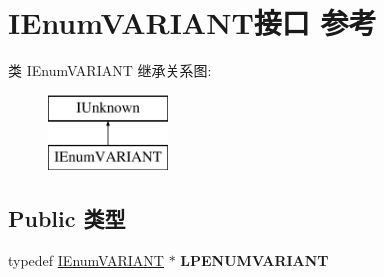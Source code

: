 \hypertarget{interface_i_enum_v_a_r_i_a_n_t}{}\section{I\+Enum\+V\+A\+R\+I\+A\+N\+T接口 参考}
\label{interface_i_enum_v_a_r_i_a_n_t}
类 I\+Enum\+V\+A\+R\+I\+A\+NT 继承关系图\+:\begin{figure}[H]
\begin{center}
\leavevmode
\includegraphics[height=2.000000cm]{interface_i_enum_v_a_r_i_a_n_t}
\end{center}
\end{figure}
\subsection*{Public 类型}
\begin{DoxyCompactItemize}
\item 
\mbox{\label{interface_i_enum_v_a_r_i_a_n_t_a48cf6d057c9e6fca9cf57a650cf50d2c}} 
typedef \hyperlink{interface_i_enum_v_a_r_i_a_n_t}{I\+Enum\+V\+A\+R\+I\+A\+NT} $\ast$ {\bfseries L\+P\+E\+N\+U\+M\+V\+A\+R\+I\+A\+NT}
\end{DoxyCompactItemize}
